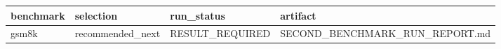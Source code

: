 \begin{tabular}{llll}
\toprule
benchmark & selection & run\_status & artifact \\
\midrule
gsm8k & recommended\_next & RESULT\_REQUIRED & SECOND\_BENCHMARK\_RUN\_REPORT.md \\
\bottomrule
\end{tabular}
